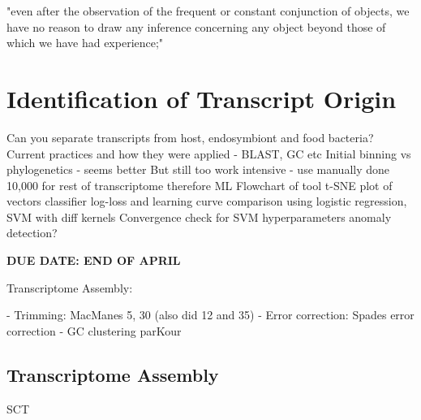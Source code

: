 \graphicspath{{chapters/4.Chapter_2/figures}}

\begin{savequote}[75mm]
"even after the observation of the frequent or constant conjunction of objects, we have no reason to draw any inference concerning any object beyond those of which we have had experience;"
\end{savequote}


\chapter{Identification of Transcript Origin}

Can you separate transcripts from host, endosymbiont and food bacteria?
Current practices and how they were applied - BLAST, GC etc
Initial binning vs phylogenetics - seems better
But still too work intensive - use manually done 10,000 for rest of transcriptome therefore ML
Flowchart of tool 
t-SNE plot of vectors
classifier log-loss and learning curve comparison using logistic regression, SVM with diff kernels
Convergence check for SVM hyperparameters
anomaly detection?

\bf{DUE DATE: END OF APRIL}



Transcriptome Assembly:

- Trimming: MacManes 5, 30 (also did 12 and 35)
- Error correction: Spades error correction
- GC clustering parKour


\section{Transcriptome Assembly}


SCT
